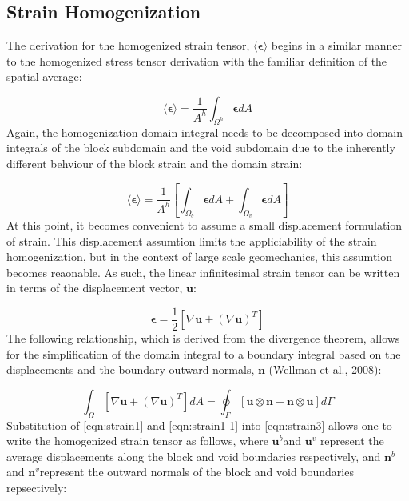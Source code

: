 \subsection{Strain Homogenization}

The derivation for the homogenized strain tensor, $\langle\boldsymbol{\epsilon}\rangle$
begins in a similar manner to the homogenized stress tensor derivation
with the familiar definition of the spatial average:

\begin{equation}
\langle\boldsymbol{\epsilon}\rangle=\frac{1}{A^{h}}\int_{\Omega^{h}}\boldsymbol{\epsilon}dA\label{eqn:strain2}
\end{equation}
Again, the homogenization domain integral needs to be decomposed into
domain integrals of the block subdomain and the void subdomain due
to the inherently different behviour of the block strain and the domain
strain:

\begin{equation}
\langle\boldsymbol{\epsilon}\rangle=\frac{1}{A^{h}}\left[\int_{\Omega_{b}}\boldsymbol{\epsilon}dA+\int_{\Omega_{v}}\boldsymbol{\epsilon}dA\right]\label{eqn:strain3}
\end{equation}
At this point, it becomes convenient to assume a small displacement
formulation of strain. This displacement assumtion limits the appliciability
of the strain homogenization, but in the context of large scale geomechanics,
this assumtion becomes reaonable. As such, the linear infinitesimal
strain tensor can be written in terms of the displacement vector, $\mathbf{u}$:

\begin{equation}
\boldsymbol{\epsilon}=\frac{1}{2}\left[\nabla\mathbf{u}+\left(\nabla\mathbf{u}\right)^{T}\right]\label{eqn:strain1}
\end{equation}
The following relationship, which is derived from the divergence theorem,
allows for the simplification of the domain integral to a boundary
integral based on the displacements and the boundary outward normals,
$\mathbf{n}$ (Wellman et al., 2008):

\begin{equation}
\int_{\Omega}\left[\nabla\mathbf{u}+\left(\nabla\mathbf{u}\right)^{T}\right]dA=\oint_{\Gamma}\left[\mathbf{u}\otimes\mathbf{n}+\mathbf{n}\otimes\mathbf{u}\right]d\Gamma\label{eqn:strain1-1}
\end{equation}
Substitution of \ref{eqn:strain1} and \ref{eqn:strain1-1} into \ref{eqn:strain3}
allows one to write the homogenized strain tensor as follows, where
$\mathbf{u}^{b}$and $\mathbf{u}^{v}$ represent the average displacements
along the block and void boundaries respectively, and $\mathbf{n}^{b}$and
$\mathbf{n}^{v}$represent the outward normals of the block and void
boundaries repsectively:

